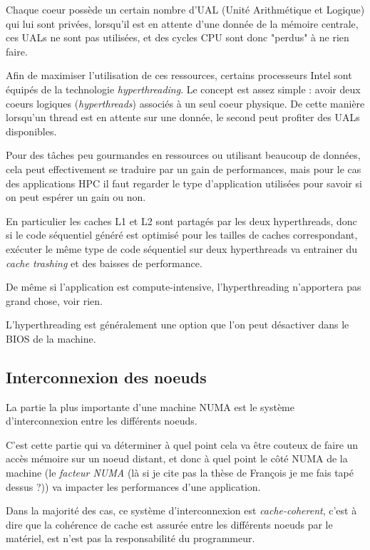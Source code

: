 Chaque coeur possède un certain nombre d'UAL (Unité Arithmétique et Logique) qui lui sont privées, lorsqu'il est en attente d'une donnée de la mémoire centrale, ces UALs ne sont pas utilisées, et des cycles CPU sont donc "perdus" à ne rien faire.

Afin de maximiser l'utilisation de ces ressources, certains processeurs Intel sont équipés de la technologie \emph{hyperthreading}.
Le concept est assez simple : avoir deux coeurs logiques (\emph{hyperthreads}) associés à un seul coeur physique.
De cette manière lorsqu'un thread est en attente sur une donnée, le second peut profiter des UALs disponibles.

Pour des tâches peu gourmandes en ressources ou utilisant beaucoup de données, cela peut effectivement se traduire par un gain de performances, mais pour le cas des applications HPC il faut regarder le type d'application utilisées pour savoir si on peut espérer un gain ou non.

En particulier les caches L1 et L2 sont partagés par les deux hyperthreads, donc si le code séquentiel généré est optimisé pour les tailles de caches correspondant, exécuter le même type de code séquentiel sur deux hyperthreads va entrainer du \emph{cache trashing} et des baisses de performance.

De même si l'application est compute-intensive, l'hyperthreading n'apportera pas grand chose, voir rien.

L'hyperthreading est généralement une option que l'on peut désactiver dans le BIOS de la machine.


\subsection{Interconnexion des noeuds}

La partie la plus importante d'une machine NUMA est le système d'interconnexion entre les différents noeuds.

C'est cette partie qui va déterminer à quel point cela va être couteux de faire un accès mémoire sur un noeud distant, et donc à quel point le côté NUMA de la machine (le \emph{facteur NUMA} (là si je cite pas la thèse de François je me fais tapé dessus ?)) va impacter les performances d'une application.

Dans la majorité des cas, ce système d'interconnexion est \emph{cache-coherent}, c'est à dire que la cohérence de cache est assurée entre les différents noeuds par le matériel, est n'est pas la responsabilité du programmeur.

